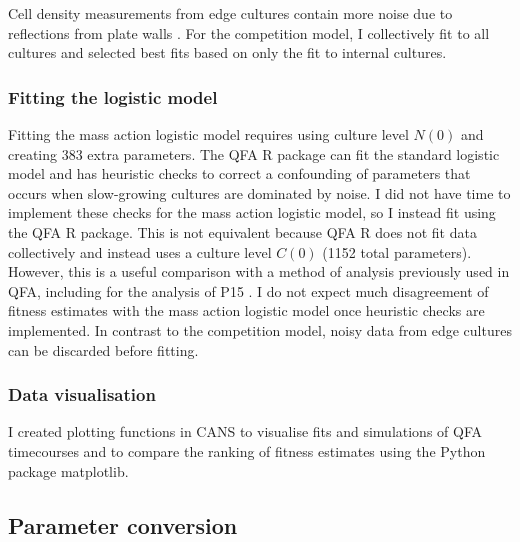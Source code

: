 Cell density measurements from edge cultures contain more noise due to
reflections from plate walls \citep{Lawless2010}. For the competition
model, I collectively fit to all cultures and selected best fits based
on only the fit to internal cultures.


\subsubsection{Fitting the logistic model}

Fitting the mass action logistic model requires using culture level
\(N(0)\) and creating 383 extra parameters. The QFA R package
\citep{qfa2016} can fit the standard logistic model and has heuristic
checks to correct a confounding of parameters that occurs when
slow-growing cultures are dominated by noise. I did not have time to
implement these checks for the mass action logistic model, so I
instead fit using the QFA R package. This is not equivalent because
QFA R does not fit data collectively and instead uses a culture level
\(C(0)\) (1152 total parameters). However, this is a useful comparison
with a method of analysis previously used in QFA, including for the
analysis of P15 \citep{Addinall2011}. I do not expect much
disagreement of fitness estimates with the mass action logistic model
once heuristic checks are implemented. In contrast to the competition
model, noisy data from edge cultures can be discarded before fitting.

\subsubsection{Data visualisation}

I created plotting functions in CANS to visualise fits and simulations
of QFA timecourses and to compare the ranking of fitness estimates
using the Python package matplotlib.

\subsection{Parameter conversion}
\label{sec:parameter_conversion}

